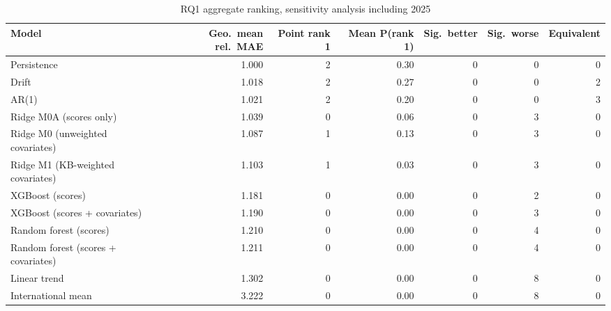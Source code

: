 \begin{table}[htbp]
\centering
\footnotesize
\caption{RQ1 aggregate ranking, sensitivity analysis including 2025}
\label{tab:A18}
\begin{tabular}{lrrrrrr}
\toprule
Model & Geo.\ mean rel.\ MAE & Point rank 1 & Mean P(rank 1) & Sig.\ better & Sig.\ worse & Equivalent \\
\midrule
Persistence & 1.000 & 2 & 0.30 & 0 & 0 & 0 \\
Drift & 1.018 & 2 & 0.27 & 0 & 0 & 2 \\
AR(1) & 1.021 & 2 & 0.20 & 0 & 0 & 3 \\
Ridge M0A (scores only) & 1.039 & 0 & 0.06 & 0 & 3 & 0 \\
Ridge M0 (unweighted covariates) & 1.087 & 1 & 0.13 & 0 & 3 & 0 \\
Ridge M1 (KB-weighted covariates) & 1.103 & 1 & 0.03 & 0 & 3 & 0 \\
XGBoost (scores) & 1.181 & 0 & 0.00 & 0 & 2 & 0 \\
XGBoost (scores + covariates) & 1.190 & 0 & 0.00 & 0 & 3 & 0 \\
Random forest (scores) & 1.210 & 0 & 0.00 & 0 & 4 & 0 \\
Random forest (scores + covariates) & 1.211 & 0 & 0.00 & 0 & 4 & 0 \\
Linear trend & 1.302 & 0 & 0.00 & 0 & 8 & 0 \\
International mean & 3.222 & 0 & 0.00 & 0 & 8 & 0 \\
\bottomrule
\end{tabular}
\par{}
\end{table}
